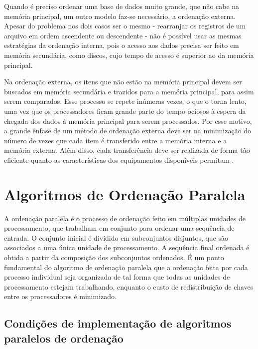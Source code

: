 Quando é preciso ordenar uma base de dados muito grande, que não cabe na memória principal, um outro modelo faz-se necessário, a ordenação externa.
Apesar do problema nos dois casos ser o mesmo - rearranjar os registros de um arquivo em ordem ascendente ou descendente - não é possível usar as mesmas estratégias da ordenação interna, pois o acesso aos dados precisa ser feito em memória secundária, como discos, cujo tempo de acesso é superior ao da memória principal.  %

Na ordenação externa, os itens que não estão na memória principal devem ser buscados em memória secundária e trazidos para a memória principal, para assim serem comparados. Esse processo se repete inúmeras vezes, o que o torna lento, uma vez que os processadores ficam grande parte do tempo ociosos à espera da chegada dos dados à memória principal para serem processados. Por esse motivo, a grande ênfase de um método de ordenação externa deve ser na minimização do número de vezes que cada item é transferido entre a memória interna e a memória externa. Além disso, cada transferência deve ser realizada de forma tão eficiente quanto as características dos equipamentos disponíveis permitam \cite{Ziviani:2007}.



\section{Algoritmos de Ordenação Paralela}

A ordenação paralela é o processo  de ordenação feito em múltiplas unidades de processamento, que trabalham em conjunto para ordenar uma sequência de entrada. O conjunto inicial é dividido em subconjuntos disjuntos, que são associados a uma única unidade de processamento. A sequência final ordenada é obtida a partir da composição dos subconjuntos ordenados. É um ponto fundamental do algoritmo de ordenação paralela que a ordenação feita por cada processo individual seja organizada de tal forma que todas as unidades de processamento estejam trabalhando, enquanto o custo de redistribuição de chaves entre os processadores é minimizado. 



\subsection{Condições de implementação de algoritmos paralelos de ordenação}
 
